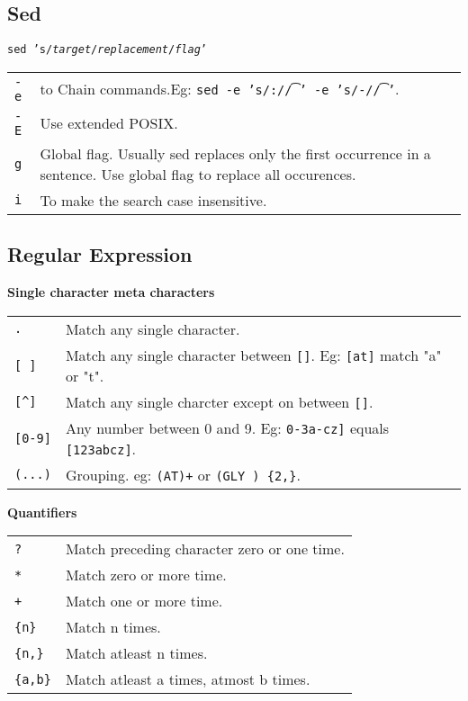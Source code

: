 \subsection{Sed}

\texttt{sed 's/\textit{target}/\textit{replacement}/\textit{flag}'}

\begin{tabularx}{\linewidth}{lX}
    \texttt{-e} & to Chain commands.Eg: \texttt{sed -e 's/:/\t/' -e 's/-/\t/'}.\\
    \texttt{-E} & Use extended POSIX.\\
    \texttt{g} & Global flag. Usually sed replaces only the first occurrence  in a sentence. Use global flag to replace all occurences.\\
    \texttt{i} & To make the search case insensitive.\\
\end{tabularx}



\subsection{Regular Expression}

\textbf{Single character meta characters}
\begin{tabularx}{\linewidth}{lX}
    \texttt{.} & Match any single character.\\
    \texttt{[ ]} & Match any single character between \texttt{[]}. Eg: \texttt{[at]} match "a" or "t".\\
    \texttt{[\^{}]} & Match any single charcter except on between \texttt{[]}.\\
    \texttt{[0-9]} & Any number between 0 and 9. Eg: \texttt{0-3a-cz]} equals \texttt{[123abcz]}.\\
    \texttt{(...)} & Grouping. eg: \texttt{(AT)+} or \texttt{(GLY ) \{2,\}}.\\
    \hline
\end{tabularx}


\textbf{Quantifiers}
\begin{tabularx}{\linewidth}{lX}
    \texttt{?} & Match preceding character zero or one time. \\
    \texttt{*} & Match zero or more time.\\
    \texttt{+} & Match one or more time.\\
    \texttt{\{n\}} & Match n times.\\
    \texttt{\{n,\}} & Match atleast n times.\\
    \texttt{\{a,b\}} & Match atleast a times, atmost b times.\\
    \hline
\end{tabularx}

